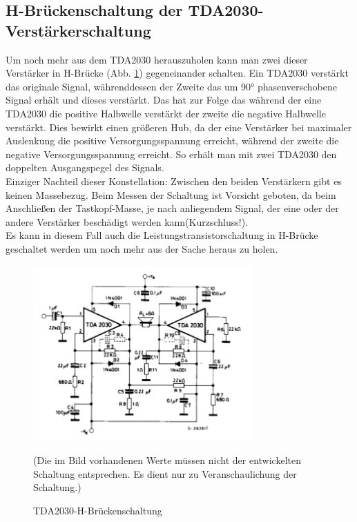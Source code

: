 \newpage
\subsection{H-Brückenschaltung der TDA2030-Verstärkerschaltung}\label{subsec:8.3.4}
Um noch mehr aus dem TDA2030 herauszuholen kann man zwei dieser Verstärker in H-Brücke (Abb. \ref{fig:8.3.4.1}) gegeneinander schalten.
Ein TDA2030 verstärkt das originale Signal, währenddessen der Zweite das um 90° phasenverschobene Signal erhält und dieses verstärkt.
Das hat zur Folge das während der eine TDA2030 die positive Halbwelle verstärkt der zweite die negative Halbwelle verstärkt.
Dies bewirkt einen größeren Hub, da der eine Verstärker bei maximaler Auslenkung die positive Versorgungsspannung erreicht, während der zweite die negative Versorgungsspannung erreicht.
So erhält man mit zwei TDA2030 den doppelten Ausgangspegel des Signals.\\
Einziger Nachteil dieser Konstellation: Zwischen den beiden Verstärkern gibt es keinen Massebezug.
Beim Messen der Schaltung ist Vorsicht geboten, da beim Anschließen der Tastkopf-Masse, je nach anliegendem Signal, der eine oder der andere Verstärker beschädigt werden kann(Kurzschluss!).\\
Es kann in diesem Fall auch die Leistungstransistorschaltung in H-Brücke geschaltet werden um noch mehr aus der Sache heraus zu holen.
\begin{figure} [H]
	\centering
	\includegraphics[width=0.75\textwidth]{img/Grundlagen/TDA2030/TDA2030-H-Bruecke.PNG}
	\caption[TDA2030-H-Brückenschaltung]{TDA2030-H-Brückenschaltung\footnotemark}
	\text (Die im Bild vorhandenen Werte müssen nicht der entwickelten Schaltung entsprechen. Es dient nur zu Veranschaulichung der Schaltung.)
	\label {fig:8.3.4.1}
\end{figure}

